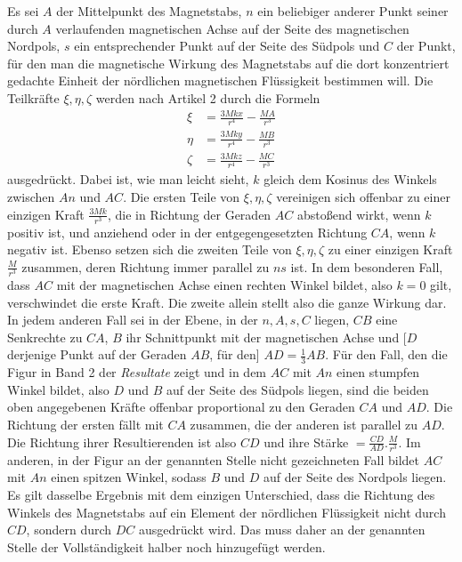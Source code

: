 Es sei $A$ der Mittelpunkt des Magnetstabs, $n$ ein beliebiger anderer Punkt seiner durch $A$ verlaufenden magnetischen Achse auf der Seite des magnetischen Nordpols, $s$ ein entsprechender Punkt auf der Seite des Südpols und $C$ der Punkt, für den man die magnetische Wirkung des Magnetstabs auf die dort konzentriert gedachte Einheit der nördlichen magnetischen Flüssigkeit bestimmen will. Die Teilkräfte $\xi,\eta,\zeta$ werden nach Artikel 2 durch die Formeln
\[
\begin{aligned}
\xi&=\frac{3Mkx}{r^4}-\frac{MA}{r^3}\\
\eta&=\frac{3Mky}{r^4}-\frac{MB}{r^3}\\
\zeta&=\frac{3Mkz}{r^4}-\frac{MC}{r^3}
\end{aligned}
\]
ausgedrückt. Dabei ist, wie man leicht sieht, $k$ gleich dem Kosinus des Winkels zwischen $An$ und $AC$. Die ersten Teile von $\xi,\eta,\zeta$ vereinigen sich offenbar zu einer einzigen Kraft $\frac{3Mk}{r^3}$, die in Richtung der Geraden $AC$ abstoßend wirkt, wenn $k$ positiv ist, und anziehend oder in der entgegengesetzten Richtung $CA$, wenn $k$ negativ ist. Ebenso setzen sich die zweiten Teile von $\xi,\eta,\zeta$ zu einer einzigen Kraft $\frac{M}{r^3}$ zusammen, deren Richtung immer parallel zu $ns$ ist. In dem besonderen Fall, dass $AC$ mit der magnetischen Achse einen rechten Winkel bildet, also $k=0$ gilt, verschwindet die erste Kraft. Die zweite allein stellt also die
ganze Wirkung dar. In jedem anderen Fall sei in der Ebene, in der $n,A,s,C$ liegen, $CB$ eine Senkrechte zu $CA$, $B$ ihr Schnittpunkt mit der magnetischen Achse und [$D$ derjenige Punkt auf der Geraden $AB$, für den] $AD=\tfrac13AB$. Für den Fall, den die Figur in Band 2 der \textit{Resultate} zeigt und in dem $AC$ mit $An$ einen stumpfen Winkel bildet, also $D$ und $B$ auf der Seite des Südpols liegen, sind die beiden oben angegebenen Kräfte offenbar proportional zu den Geraden $CA$ und $AD$. Die Richtung der ersten fällt mit $CA$ zusammen, die der anderen ist parallel zu $AD$. Die Richtung ihrer Resultierenden ist also $CD$ und ihre Stärke $=\frac{CD}{AD}.\frac{M}{r^3}$. Im anderen, in der Figur an der genannten Stelle nicht gezeichneten Fall bildet $AC$ mit $An$ einen spitzen Winkel, sodass $B$ und $D$ auf der Seite des Nordpols liegen. Es gilt dasselbe Ergebnis mit dem einzigen Unterschied, dass die Richtung des Winkels des Magnetstabs auf ein Element der nördlichen Flüssigkeit nicht durch $CD$, sondern durch $DC$ ausgedrückt wird. Das muss daher an der genannten Stelle der Vollständigkeit halber noch hinzugefügt werden.
